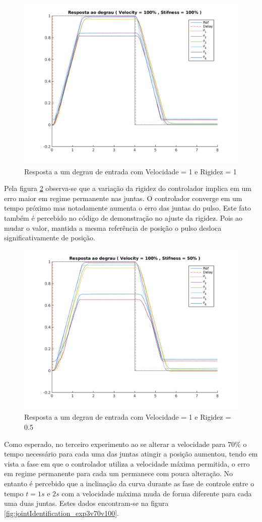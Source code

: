 \begin{figure}[H]
    \centering
    \includegraphics[width=0.6\linewidth]{tex/figs/jointIdentification_exp1v100v100.png}
    \caption{Resposta a um degrau de entrada com Velocidade = 1 e Rigidez = 1}
    \label{fig:jointIdentification_exp1v100v100}
\end{figure}

Pela figura \ref{fig:jointIdentification_exp2v100v50} observa-se que a variação da rigidez do controlador implica em um erro maior em regime permanente nas juntas. O controlador converge em um tempo próximo mas notadamente aumenta o erro das juntas do pulso. Este fato também é percebido no código de demonstração no ajuste da rigidez. Pois ao mudar o valor, mantida a mesma referência de posição o pulso desloca significativamente de posição.

\begin{figure}[H]
    \centering
    \includegraphics[width=0.6\linewidth]{tex/figs/jointIdentification_exp2v100v50.png}
    \caption{Resposta a um degrau de entrada com Velocidade = 1 e Rigidez = 0.5}
    \label{fig:jointIdentification_exp2v100v50}
\end{figure}

Como esperado, no terceiro experimento ao se alterar a velocidade para $70\%$ o tempo necessário para cada uma das juntas atingir a posição aumentou, tendo em vista a fase em que o controlador utiliza a velocidade máxima permitida, o erro em regime permanente para cada um permanece com pouca alteração. No entanto é percebido que a inclinação da curva durante as fase de controle entre o tempo $t=1s$ e $2s$ com a velocidade máxima muda de forma diferente para cada uma duas juntas. Estes dados encontram-se na figura \ref{fig:jointIdentification_exp3v70v100}.

